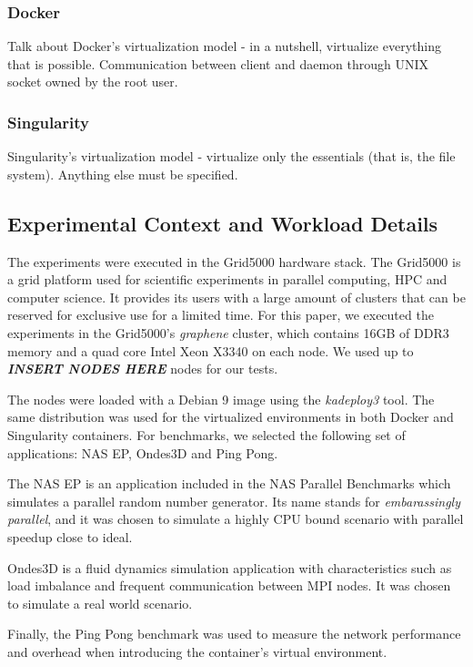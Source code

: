 \documentclass[12pt]{article}
\begin{document}
\subsubsection{Docker}
Talk about Docker's virtualization model - in a nutshell, virtualize everything that is possible. Communication between client and daemon through UNIX socket owned by the root user.

\subsubsection{Singularity}
Singularity's virtualization model - virtualize only the essentials (that is, the file system). Anything else must be specified.

\subsection{Experimental Context and Workload Details}
The experiments were executed in the Grid5000 hardware stack. The Grid5000 is a grid platform used for scientific experiments in parallel computing, HPC and computer science. It provides its users with a large amount of clusters that can be reserved for exclusive use for a limited time. For this paper, we executed the experiments in the Grid5000's \textit{graphene} cluster, which contains 16GB of DDR3 memory and a quad core Intel Xeon X3340 on each node. We used up to \textit{\textbf{INSERT NODES HERE}} nodes for our tests.

The nodes were loaded with a Debian 9 image using the \textit{kadeploy3} tool. The same distribution was used for the virtualized environments in both Docker and Singularity containers. For benchmarks, we selected the following set of applications: NAS EP, Ondes3D and Ping Pong. 

The NAS EP is an application included in the NAS Parallel Benchmarks which simulates a parallel random number generator. Its name stands for \textit{embarassingly parallel}, and it was chosen to simulate a highly CPU bound scenario with parallel speedup close to ideal. 

Ondes3D is a fluid dynamics simulation application with characteristics such as load imbalance and frequent communication between MPI nodes. It was chosen to simulate a real world scenario.

Finally, the Ping Pong benchmark was used to measure the network performance and overhead when introducing the container's virtual environment.
\end{document}
